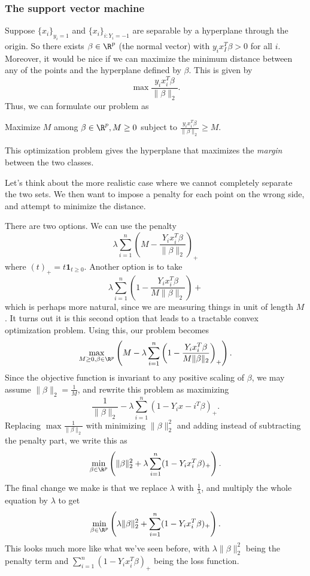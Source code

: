 \documentclass[a4paper]{article}
\begin{document}
\subsubsection*{The support vector machine}
Suppose $\{x_i\}_{y_i = 1}$ and $\{x_i\}_{i: Y_i = -1}$ are separable by a hyperplane through the origin. So there exists $\beta \in \R^p$ (the normal vector) with $y_i x_I^T \beta> 0$ for all $i$. Moreover, it would be nice if we can maximize the minimum distance between any of the points and the hyperplane defined by $\beta$. This is given by
\[
  \max \frac{y_i x_i^T \beta}{\|\beta\|_2}.
\]
Thus, we can formulate our problem as
\begin{center}
  Maximize $M$ among $\beta \in \R^p, M \geq 0$ subject to $\frac{y_i x_i^T \beta}{\|\beta\|_2} \geq M$.
\end{center}
This optimization problem gives the hyperplane that maximizes the \emph{margin} between the two classes.

Let's think about the more realistic case where we cannot completely separate the two sets. We then want to impose a penalty for each point on the wrong side, and attempt to minimize the distance.

There are two options. We can use the penalty
\[
  \lambda \sum_{i = 1}^n \left(M - \frac{Y_i x_i^T \beta}{\|\beta\|_2}\right)_+
\]
where $(t)_+ = t \mathbf{1}_{t \geq 0}$. Another option is to take
\[
  \lambda \sum_{i = 1}^n \left(1 - \frac{Y_i x_i^T \beta}{M \|\beta\|_2}\right)+
\]
which is perhaps more natural, since we are measuring things in unit of length $M$. It turns out it is this second option that leads to a tractable convex optimization problem. Using this, our problem becomes
\[
  \max_{M \geq 0, \beta \in \R^p} \left(M - \lambda \sum_{i = 1}^n \left(1 - \frac{Y_i x_i^T \beta}{M \|\beta\|_2}\right)_+\right).
\]
Since the objective function is invariant to any positive scaling of $\beta$, we may assume $\|\beta\|_2 = \frac{1}{M}$, and rewrite this problem as maximizing
\[
  \frac{1}{\|\beta\|_2} - \lambda \sum_{i = 1}^n (1 - Y_i x-i^T \beta)_+.
\]
Replacing $\max \frac{1}{\|\beta\|_2}$ with minimizing $\|\beta\|_2^2$ and adding instead of subtracting the penalty part, we write this as
\[
  \min_{\beta \in \R^p} \left(\|\beta\|_2^2 + \lambda \sum_{i = 1}^n (1 - Y_i x_i^T \beta)_+\right).
\]
The final change we make is that we replace $\lambda$ with $\frac{1}{\lambda}$, and multiply the whole equation by $\lambda$ to get
\[
  \min_{\beta \in \R^p} \left(\lambda \|\beta\|_2^2 + \sum_{i = 1}^n (1 - Y_i x_i^T \beta)_+\right).
\]
This looks much more like what we've seen before, with $\lambda \|\beta\|_2^2$ being the penalty term and $\sum_{i = 1}^n (1 - Y_i x_i^T \beta)_+$ being the loss function.
\end{document}
